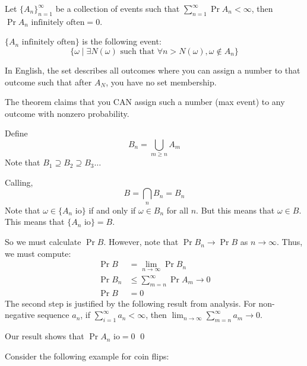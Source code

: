\begin{theorem} 
    Let $\{A_n\}_{n = 1}^{\infty}$ be a collection of events such that $\sum_{n = 1}^{\infty} \Pr{A_n} < \infty$, then
    $\Pr{A_n \text{ infinitely often}} = 0$.

    $\{A_n \text{ infinitely often}\}$ is the following event:
    \[ \{\omega \mid \exists N(\omega) \text{ such that } \forall n > N(\omega), \omega \not\in A_n \} \]

    In English, the set describes all outcomes where you can assign a number to that outcome such that
    after $A_N$, you have no set membership.

    The theorem claims that you CAN assign such a number (max event) to any outcome with nonzero probability.

    \begin{proof*}
        Define
        \[ B_n = \bigcup_{m \geq n} A_m \]
        Note that $B_1 \supseteq B_2 \supseteq B_3 \dots$
        
        Calling,
        \[ B = \bigcap_{n} B_n = B_n \]
        Note that $\omega \in \{ A_n \text{ io}\}$ if and only if $\omega \in B_n$ for all $n$.
        But this means that $\omega \in B$. This means that $\{ A_n \text{ io}\} = B$.

        So we must calculate $\Pr{B}$. However, note that $\Pr{B_n} \to \Pr{B}$ as $n \to \infty$.
        Thus, we must compute:
        \begin{align*}
            \Pr{B} &= \lim_{n \to \infty} \Pr{B_n} \\
            \Pr{B_n} &\leq \sum_{m = n}^{\infty} \Pr{A_m} \to 0 \\
            \Pr{B} &= 0
        \end{align*}
        The second step is justified by the following result from analysis. For non-negative sequence $a_n$, if $\sum_{i = 1}^{\infty} a_n < \infty$, then
        $\lim_{n \to \infty} \sum_{m = n}^{\infty} a_m \to 0$.

        Our result shows that $\Pr{A_n \text{ io}} = 0$ \qed
    \end{proof*}
\end{theorem}

Consider the following example for coin flips:

